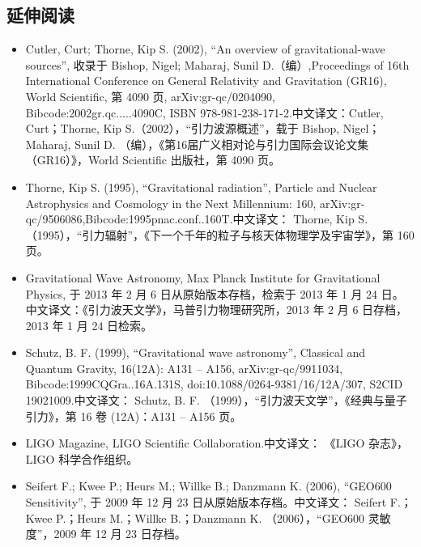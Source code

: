 \subsection{延伸阅读}
\begin{itemize}
\item Cutler, Curt; Thorne, Kip S. (2002), ``An overview of gravitational-wave sources'', 收录于 Bishop, Nigel; Maharaj, Sunil D.（编）,Proceedings of 16th International Conference on General Relativity and Gravitation (GR16), World Scientific, 第 4090 页, arXiv:gr-qc/0204090, Bibcode:2002gr.qc.....4090C, ISBN 978-981-238-171-2.中文译文：Cutler, Curt；Thorne, Kip S.（2002），“引力波源概述”，载于 Bishop, Nigel；Maharaj, Sunil D. （编），《第16届广义相对论与引力国际会议论文集（GR16）》，World Scientific 出版社，第 4090 页。
\item Thorne, Kip S. (1995), ``Gravitational radiation'', Particle and Nuclear Astrophysics and Cosmology in the Next Millennium: 160, arXiv:gr-qc/9506086,Bibcode:1995pnac.conf..160T.中文译文： Thorne, Kip S. （1995），“引力辐射”，《下一个千年的粒子与核天体物理学及宇宙学》，第 160 页。
\item Gravitational Wave Astronomy, Max Planck Institute for Gravitational Physics, 于 2013 年 2 月 6 日从原始版本存档，检索于 2013 年 1 月 24 日。中文译文：《引力波天文学》，马普引力物理研究所，2013 年 2 月 6 日存档，2013 年 1 月 24 日检索。
\item Schutz, B. F. (1999), ``Gravitational wave astronomy'', Classical and Quantum Gravity, 16(12A): A131 – A156, arXiv:gr-qc/9911034, Bibcode:1999CQGra..16A.131S, doi:10.1088/0264-9381/16/12A/307, S2CID 19021009.中文译文： Schutz, B. F. （1999），“引力波天文学”，《经典与量子引力》，第 16 卷 (12A)：A131 – A156 页。
\item LIGO Magazine, LIGO Scientific Collaboration.中文译文： 《LIGO 杂志》，LIGO 科学合作组织。
\item Seifert F.; Kwee P.; Heurs M.; Willke B.; Danzmann K. (2006), ``GEO600 Sensitivity'', 于 2009 年 12 月 23 日从原始版本存档。中文译文： Seifert F.；Kwee P.；Heurs M.；Willke B.；Danzmann K. （2006），“GEO600 灵敏度”，2009 年 12 月 23 日存档。
\end{itemize}
